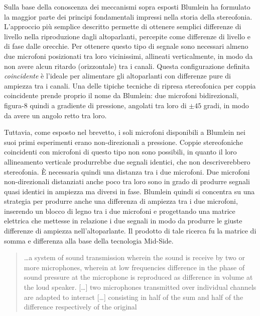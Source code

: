 Sulla base della conoscenza dei meccanismi sopra esposti Blumlein ha formulato
la maggior parte dei principi fondamentali impressi nella storia della stereofonia.
L'approccio più semplice descritto permette di ottenere semplici differenze di livello
nella riproduzione dagli altoparlanti, percepite come differenze di livello e di
fase dalle orecchie. Per ottenere questo tipo di segnale sono necessari almeno due microfoni
posizionati tra loro vicinissimi, allineati verticalmente, in modo da non avere alcun ritardo (orizzontale) tra i canali.
Questa configurazione definita \emph{coincidente} è l'ideale per alimentare
gli altoparlanti con differenze pure di ampiezza tra i canali. Una delle tipiche
tecniche di ripresa stereofonica per coppia coincidente prende proprio il nome
da Blumlein: due microfoni bidirezionali, figura-8 quindi a gradiente di pressione,
angolati tra loro di $\pm45$ gradi, in modo da avere un angolo retto tra loro.

Tuttavia, come esposto nel brevetto, i soli microfoni disponibili a Blumlein nei
suoi primi esperimenti erano non-direzionali a pressione. Coppie stereofoniche coincidenti
con microfoni di questo tipo non sono possibili, in quanto il loro allineamento verticale
produrrebbe due segnali identici, che non descriverebbero stereofonia. È necessaria
quindi una distanza tra i due microfoni. Due microfoni non-direzionali distanziati
anche poco tra loro sono in grado di produrre segnali quasi identici in ampiezza
ma diversi in fase. Blumlein quindi si concentra su una strategia per produrre
anche una differenza di ampiezza tra i due microfoni, inserendo un blocco di legno
tra i due microfoni e progettando una matrice elettrica che mettesse in
relazione i due segnali in modo da produrre le giuste differenze di ampiezza
nell'altoparlante. Il prodotto di tale ricerca fu la matrice di somma e differenza
alla base della tecnologia Mid-Side.

\begin{quote}
\ldots a system of sound transmission wherein the sound
is receive by two or more microphones, wherein at low frequencies difference in
the phase of sound pressure at the microphone is reproduced as difference in
volume at the loud speaker. [\ldots] two microphones transmitted over individual
channels are adapted to interact [\ldots] consisting in half of the sum and half
of the difference respectively of the original \cite{ab58}
\end{quote}

